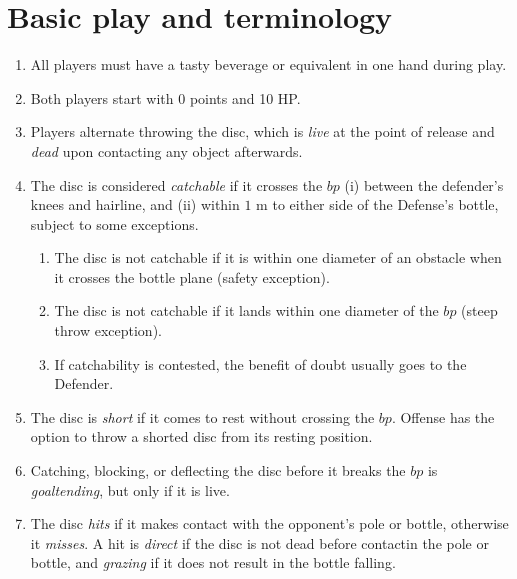 \documentclass[11pt,letterpaper,twocolumn,english,DIV=calc]{scrartcl}
\begin{document}
\section{Basic play and terminology}
\begin{enumerate}
	\item All players must have a tasty beverage or equivalent in one hand during play.
	\item Both players start with 0 points and 10 HP.
	\item \label{enu:alternate_throws} Players alternate throwing the disc, which is \emph{live} at the point of release and \emph{dead} upon contacting any object afterwards.

	\item The disc is considered \emph{catchable} if it crosses the $bp$ (i) between the defender's knees and hairline, and (ii) within $1\mbox{ m}$ to either side of the Defense's bottle, subject to some exceptions.
	\begin{enumerate}
		\item The disc is not catchable if it is within one diameter of an obstacle when it crosses the bottle plane (safety exception).
		\item The disc is not catchable if it lands within one diameter of the $bp$ (steep throw exception).
		\item If catchability is contested, the benefit of doubt usually goes to the Defender.
	\end{enumerate}

	\item The disc is \emph{short} if it comes to rest without crossing the $bp$. 
		Offense has the option to throw a shorted disc from its resting position. 

	\item Catching, blocking, or deflecting the disc before it breaks the $bp$ is \emph{goaltending}, but only if it is live.
	
	\item The disc \emph{hits} if it makes contact with the opponent's pole or bottle, otherwise it \emph{misses}.
	A hit is \emph{direct} if the disc is not dead before contactin the pole or bottle, and \emph{grazing} if it does not result in the bottle falling.

\end{enumerate}
\end{document}
